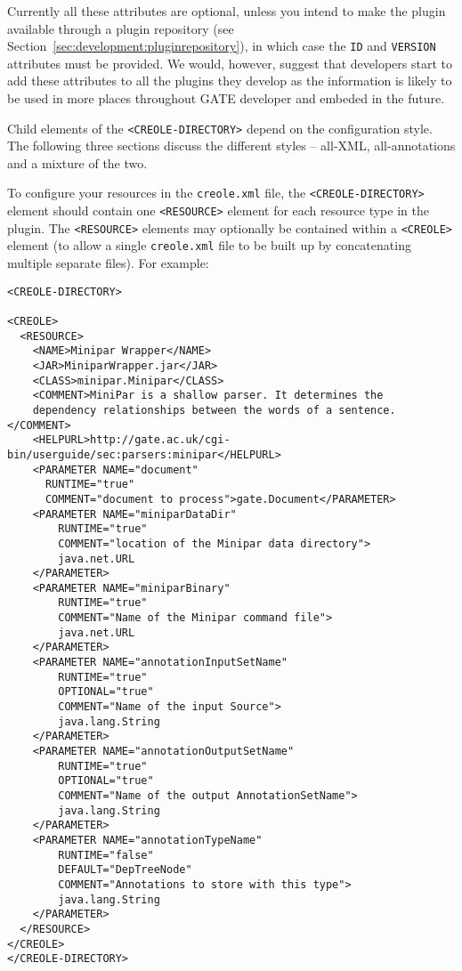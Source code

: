 Currently all these attributes are optional, unless you intend to make the plugin
available through a plugin repository (see Section~\ref{sec:development:pluginrepository}),
in which case the {\tt ID} and {\tt VERSION} attributes must be provided. We would,
however, suggest that developers start to add these attributes to all the plugins
they develop as the information is likely to be used in more places throughout GATE
developer and embeded in the future.

Child elements of the \verb|<CREOLE-DIRECTORY>| depend on the configuration
style.  The following three sections discuss the different styles -- all-XML,
all-annotations and a mixture of the two.


To configure your resources in the {\tt creole.xml} file, the
\verb|<CREOLE-DIRECTORY>| element should contain one \verb|<RESOURCE>| element
for each resource type in the plugin.  The \verb|<RESOURCE>| elements may
optionally be contained within a \verb|<CREOLE>| element (to allow a single
{\tt creole.xml} file to be built up by concatenating multiple separate files).
For example:

\begin{small}\begin{verbatim}
<CREOLE-DIRECTORY>

<CREOLE>
  <RESOURCE>
    <NAME>Minipar Wrapper</NAME>
    <JAR>MiniparWrapper.jar</JAR>
    <CLASS>minipar.Minipar</CLASS>
    <COMMENT>MiniPar is a shallow parser. It determines the
    dependency relationships between the words of a sentence.</COMMENT>
    <HELPURL>http://gate.ac.uk/cgi-bin/userguide/sec:parsers:minipar</HELPURL>
    <PARAMETER NAME="document"
	  RUNTIME="true"
	  COMMENT="document to process">gate.Document</PARAMETER>
    <PARAMETER NAME="miniparDataDir" 
        RUNTIME="true"
        COMMENT="location of the Minipar data directory">
        java.net.URL
    </PARAMETER>
    <PARAMETER NAME="miniparBinary" 
        RUNTIME="true"
        COMMENT="Name of the Minipar command file">
        java.net.URL
    </PARAMETER>
    <PARAMETER NAME="annotationInputSetName" 
        RUNTIME="true"
        OPTIONAL="true"
        COMMENT="Name of the input Source">
        java.lang.String
    </PARAMETER>
    <PARAMETER NAME="annotationOutputSetName" 
        RUNTIME="true"
        OPTIONAL="true"
        COMMENT="Name of the output AnnotationSetName">
        java.lang.String
    </PARAMETER>
    <PARAMETER NAME="annotationTypeName" 
        RUNTIME="false"
        DEFAULT="DepTreeNode" 
        COMMENT="Annotations to store with this type">
        java.lang.String
    </PARAMETER>
  </RESOURCE>
</CREOLE>
</CREOLE-DIRECTORY>
\end{verbatim}\end{small}

